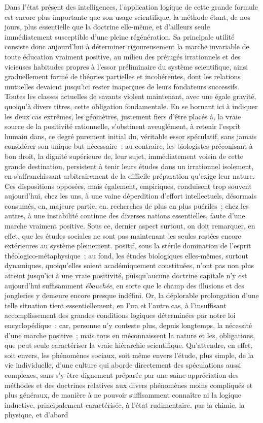 \documentclass[french,twoside]{book} %
\begin{document}
Dans l’état présent des intelligences, l’application logique de cette grande formule est encore plus importante que son usage scientifique, la méthode étant, de nos jours, plus essentielle que la doctrine elle-même, et d’ailleurs seule immédiatement susceptible d’une pleine régénération. Sa principale utilité consiste donc aujourd’hui à déterminer rigoureusement la marche invariable de toute éducation vraiment positive, au milieu des préjugés irrationnels et des vicieuses habitudes propres à l’essor préliminaire du système scientifique, ainsi graduellement formé de théories partielles et incohérentes, dont les relations mutuelles devaient jusqu’ici rester inaperçues de leurs fondateurs successifs. Toutes les classes actuelles de savants violent maintenant, avec une égale gravité, quoiqu’à divers titres, cette obligation fondamentale. En se bornant ici à indiquer les deux cas extrêmes, les géomètres, justement fiers d’être placés à, la vraie source de la positivité rationnelle, s’obstinent aveuglément, à retenir l’esprit humain dans, ce degré purement initial du, véritable essor spéculatif, sans jamais considérer son unique but nécessaire ; au contraire, les biologistes préconisant à bon droit, la dignité supérieure de, leur sujet, immédiatement voisin de cette grande destination, persistent à tenir leurs études dans un irrationnel isolement, en s’affranchissant arbitrairement de la difficile préparation qu’exige leur nature. Ces dispositions opposées, mais également, empiriques, conduisent trop souvent aujourd’hui, chez les uns, à une vaine déperdition d’effort intellectuels, désormais consumés, en, majeure partie, en. recherches de plus en plus puériles ; chez les autres, à une instabilité continue des diverses nations essentielles, faute d’une marche vraiment positive. Sous ce, dernier aspect surtout, on doit remarquer, en effet, que les études sociales ne sont pas maintenant les seules restées encore extérieures au système pleinement. positif, sous la stérile domination de l’esprit théologico-métaphysique ; au fond, les études biologiques elles-mêmes, surtout dynamiques, quoiqu’elles soient académiquement constituées, n’ont pas non plus atteint jusqu’ici à une vraie positivité, puisqu’aucune doctrine capitale n’y est aujourd’hui suffisamment {\itshape ébauchée}, en sorte que le champ des illusions et des jongleries y demeure encore presque indéfini. Or, la déplorable prolongation d’une telle situation tient essentiellement, en l’un et l’autre cas, à l’insuffisant accomplissement des grandes conditions logiques déterminées par notre loi encyclopédique : car, personne n’y conteste plus, depuis longtemps, la nécessité d’une marche positive ; mais tous en méconnaissent la nature et les, obligations, que peut seule caractériser la vraie hiérarchie scientifique. Qu’attendre, en effet, soit envers, les phénomènes sociaux, soit même envers l’étude, plus simple, de la vie individuelle, d’une culture qui aborde directement des spéculations aussi complexes, sans s’y être dignement préparée par une saine appréciation des méthodes et des doctrines relatives aux divers phénomènes moins compliqués et plus généraux, de manière à ne pouvoir suffisamment connaître ni la logique inductive, principalement caractérisée, à l’état rudimentaire, par la chimie, la physique, et d’abord 
\end{document}
